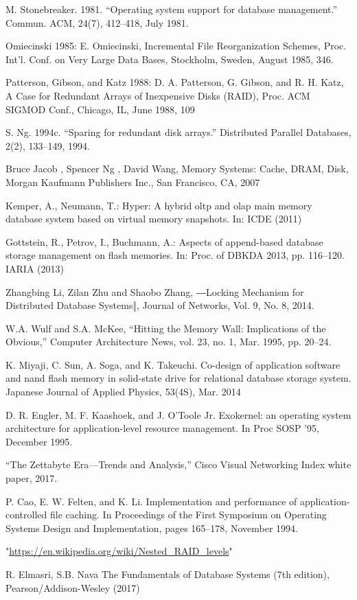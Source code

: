 \documentclass[letterpaper, 10 pt, conference]{ieeeconf}
\begin{document}
\begin{thebibliography}{99}
 M. Stonebreaker. 1981. “Operating system support for database management.” Commun. ACM, 24(7), 412–418, July 1981.

 Omiecinski 1985: E. Omiecinski, Incremental File Reorganization Schemes, Proc. Int’l. Conf. on Very Large Data Bases, Stockholm, Sweden, August 1985, 346. 

 Patterson, Gibson, and Katz 1988: D. A. Patterson, G. Gibson, and R. H. Katz, A Case for Redundant Arrays of Inexpensive Disks (RAID), Proc. ACM SIGMOD Conf., Chicago, IL, June 1988, 109

 S. Ng. 1994c. “Sparing for redundant disk arrays.” Distributed Parallel Databases, 2(2), 133–149, 1994.

 Bruce Jacob , Spencer Ng , David Wang, Memory Systems: Cache, DRAM, Disk, Morgan Kaufmann Publishers Inc., San Francisco, CA, 2007

 Kemper, A., Neumann, T.: Hyper: A hybrid oltp and olap main memory database system based on virtual memory snapshots. In: ICDE (2011)

 Gottstein, R., Petrov, I., Buchmann, A.: Aspects of append-based database storage management on flash memories. In: Proc. of DBKDA 2013, pp. 116–120. IARIA (2013) 

 Zhangbing Li, Zilan Zhu and Shaobo Zhang, ―Locking Mechanism for Distributed Database Systems‖, Journal of Networks, Vol. 9, No. 8, 2014.

 W.A. Wulf and S.A. McKee, “Hitting the Memory Wall: Implications of the Obvious,” Computer Architecture News, vol. 23, no. 1, Mar. 1995, pp. 20–24.

 K. Miyaji, C. Sun, A. Soga, and K. Takeuchi. Co-design of application software and nand flash memory in solid-state drive for relational database storage system. Japanese Journal of Applied Physics, 53(4S), Mar. 2014

 D. R. Engler, M. F. Kaashoek, and J. O’Toole Jr. Exokernel: an operating system architecture for application-level resource management. In Proc SOSP ’95, December 1995.

 “The Zettabyte Era—Trends and Analysis,” Cisco Visual Networking Index white paper, 2017.

 P. Cao, E. W. Felten, and K. Li. Implementation and performance of application-controlled file caching. In Proceedings of the First Symposium on Operating Systems Design and Implementation, pages 165–178, November 1994.

 "\url {https://en.wikipedia.org/wiki/Nested_RAID_levels}"

 R. Elmasri, S.B. Nava The Fundamentals of Database Systems (7th edition), Pearson/Addison-Wesley (2017)

\end{thebibliography}
\end{document}
